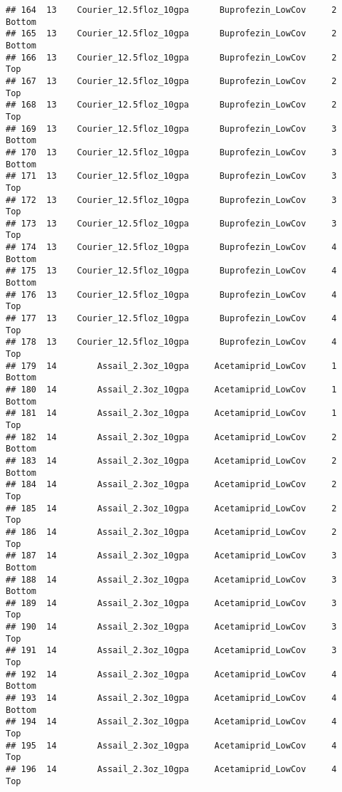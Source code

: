 \documentclass[
]{article}
\begin{document}
\begin{verbatim}
## 164  13    Courier_12.5floz_10gpa      Buprofezin_LowCov     2        Bottom
## 165  13    Courier_12.5floz_10gpa      Buprofezin_LowCov     2        Bottom
## 166  13    Courier_12.5floz_10gpa      Buprofezin_LowCov     2           Top
## 167  13    Courier_12.5floz_10gpa      Buprofezin_LowCov     2           Top
## 168  13    Courier_12.5floz_10gpa      Buprofezin_LowCov     2           Top
## 169  13    Courier_12.5floz_10gpa      Buprofezin_LowCov     3        Bottom
## 170  13    Courier_12.5floz_10gpa      Buprofezin_LowCov     3        Bottom
## 171  13    Courier_12.5floz_10gpa      Buprofezin_LowCov     3           Top
## 172  13    Courier_12.5floz_10gpa      Buprofezin_LowCov     3           Top
## 173  13    Courier_12.5floz_10gpa      Buprofezin_LowCov     3           Top
## 174  13    Courier_12.5floz_10gpa      Buprofezin_LowCov     4        Bottom
## 175  13    Courier_12.5floz_10gpa      Buprofezin_LowCov     4        Bottom
## 176  13    Courier_12.5floz_10gpa      Buprofezin_LowCov     4           Top
## 177  13    Courier_12.5floz_10gpa      Buprofezin_LowCov     4           Top
## 178  13    Courier_12.5floz_10gpa      Buprofezin_LowCov     4           Top
## 179  14        Assail_2.3oz_10gpa     Acetamiprid_LowCov     1        Bottom
## 180  14        Assail_2.3oz_10gpa     Acetamiprid_LowCov     1        Bottom
## 181  14        Assail_2.3oz_10gpa     Acetamiprid_LowCov     1           Top
## 182  14        Assail_2.3oz_10gpa     Acetamiprid_LowCov     2        Bottom
## 183  14        Assail_2.3oz_10gpa     Acetamiprid_LowCov     2        Bottom
## 184  14        Assail_2.3oz_10gpa     Acetamiprid_LowCov     2           Top
## 185  14        Assail_2.3oz_10gpa     Acetamiprid_LowCov     2           Top
## 186  14        Assail_2.3oz_10gpa     Acetamiprid_LowCov     2           Top
## 187  14        Assail_2.3oz_10gpa     Acetamiprid_LowCov     3        Bottom
## 188  14        Assail_2.3oz_10gpa     Acetamiprid_LowCov     3        Bottom
## 189  14        Assail_2.3oz_10gpa     Acetamiprid_LowCov     3           Top
## 190  14        Assail_2.3oz_10gpa     Acetamiprid_LowCov     3           Top
## 191  14        Assail_2.3oz_10gpa     Acetamiprid_LowCov     3           Top
## 192  14        Assail_2.3oz_10gpa     Acetamiprid_LowCov     4        Bottom
## 193  14        Assail_2.3oz_10gpa     Acetamiprid_LowCov     4        Bottom
## 194  14        Assail_2.3oz_10gpa     Acetamiprid_LowCov     4           Top
## 195  14        Assail_2.3oz_10gpa     Acetamiprid_LowCov     4           Top
## 196  14        Assail_2.3oz_10gpa     Acetamiprid_LowCov     4           Top

\end{verbatim}
\end{document}
